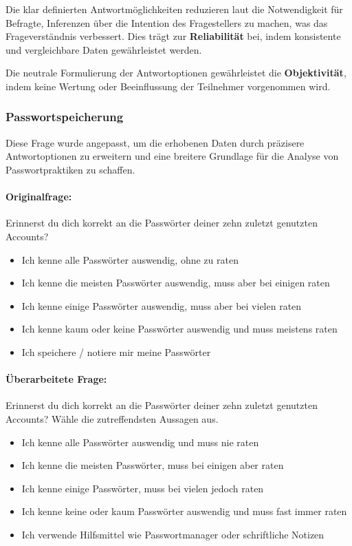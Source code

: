 \documentclass[german,report]{i1thesis}
\begin{document}
Die klar definierten Antwortmöglichkeiten reduzieren laut \citet{Schwarz1999} die Notwendigkeit für Befragte, Inferenzen über die Intention des Fragestellers zu machen, was das Frageverständnis verbessert. Dies trägt zur \textbf{Reliabilität} bei, indem konsistente und vergleichbare Daten gewährleistet werden.

Die neutrale Formulierung der Antwortoptionen gewährleistet die \textbf{Objektivität}, indem keine Wertung oder Beeinflussung der Teilnehmer vorgenommen wird.

\subsubsection{Passwortspeicherung}

Diese Frage wurde angepasst, um die erhobenen Daten durch präzisere Antwortoptionen zu erweitern und eine breitere Grundlage für die Analyse von Passwortpraktiken zu schaffen.

\paragraph{Originalfrage:}

Erinnerst du dich korrekt an die Passwörter deiner zehn zuletzt genutzten Accounts?

\begin{itemize}
    \item Ich kenne alle Passwörter auswendig, ohne zu raten
    \item Ich kenne die meisten Passwörter auswendig, muss aber bei einigen raten
    \item Ich kenne einige Passwörter auswendig, muss aber bei vielen raten
    \item Ich kenne kaum oder keine Passwörter auswendig und muss meistens raten
    \item Ich speichere / notiere mir meine Passwörter
\end{itemize}

\paragraph{Überarbeitete Frage:}

Erinnerst du dich korrekt an die Passwörter deiner zehn zuletzt genutzten Accounts? Wähle die zutreffendsten Aussagen aus.

\begin{itemize}
    \item Ich kenne alle Passwörter auswendig und muss nie raten
    \item Ich kenne die meisten Passwörter, muss bei einigen aber raten
    \item Ich kenne einige Passwörter, muss bei vielen jedoch raten
    \item Ich kenne keine oder kaum Passwörter auswendig und muss fast immer raten
    \item Ich verwende Hilfsmittel wie Passwortmanager oder schriftliche Notizen
\end{itemize}
\end{document}
